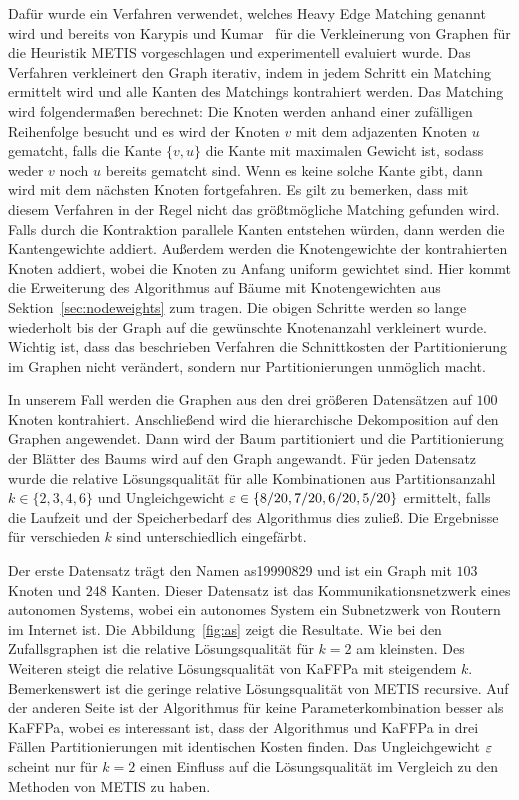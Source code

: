 Dafür wurde ein Verfahren verwendet, welches Heavy Edge Matching genannt wird und bereits von Karypis und Kumar~\cite{KK98} für die Verkleinerung von Graphen für die Heuristik METIS vorgeschlagen und experimentell evaluiert wurde.
Das Verfahren verkleinert den Graph iterativ, indem in jedem Schritt ein Matching ermittelt wird und alle Kanten des Matchings kontrahiert werden.
Das Matching wird folgendermaßen berechnet:
Die Knoten werden anhand einer zufälligen Reihenfolge besucht und es wird der Knoten $v$ mit dem adjazenten Knoten $u$ gematcht, falls die Kante $\{v, u\}$ die Kante mit maximalen Gewicht ist, sodass weder $v$ noch $u$ bereits gematcht sind.
Wenn es keine solche Kante gibt, dann wird mit dem nächsten Knoten fortgefahren.
Es gilt zu bemerken, dass mit diesem Verfahren in der Regel nicht das größtmögliche Matching gefunden wird.
Falls durch die Kontraktion parallele Kanten entstehen würden, dann werden die Kantengewichte addiert.
Außerdem werden die Knotengewichte der kontrahierten Knoten addiert, wobei die Knoten zu Anfang uniform gewichtet sind.
Hier kommt die Erweiterung des Algorithmus auf Bäume mit Knotengewichten aus Sektion~\ref{sec:nodeweights} zum tragen.
Die obigen Schritte werden so lange wiederholt bis der Graph auf die gewünschte Knotenanzahl verkleinert wurde.
Wichtig ist, dass das beschrieben Verfahren die Schnittkosten der Partitionierung im Graphen nicht verändert, sondern nur Partitionierungen unmöglich macht.

In unserem Fall werden die Graphen aus den drei größeren Datensätzen auf $100$ Knoten kontrahiert.
Anschließend wird die hierarchische Dekomposition auf den Graphen angewendet.
Dann wird der Baum partitioniert und die Partitionierung der Blätter des Baums wird auf den Graph angewandt.
Für jeden Datensatz wurde die relative Lösungsqualität für alle Kombinationen aus Partitionsanzahl $k \in \{2,3,4,6\}$ und Ungleichgewicht $\varepsilon \in \{8/20, 7/20, 6/20, 5/20\}$ ermittelt, falls die Laufzeit und der Speicherbedarf des Algorithmus dies zuließ.
Die Ergebnisse für verschieden $k$ sind unterschiedlich eingefärbt.

Der erste Datensatz trägt den Namen as19990829 und ist ein Graph mit $103$ Knoten und $248$ Kanten.
Dieser Datensatz ist das Kommunikationsnetzwerk eines autonomen Systems, wobei ein autonomes System ein Subnetzwerk von Routern im Internet ist.
Die Abbildung~\ref{fig:as} zeigt die Resultate.
Wie bei den Zufallsgraphen ist die relative Lösungsqualität für $k=2$ am kleinsten.
Des Weiteren steigt die relative Lösungsqualität von KaFFPa mit steigendem $k$.
Bemerkenswert ist die geringe relative Lösungsqualität von METIS recursive.
Auf der anderen Seite ist der Algorithmus für keine Parameterkombination besser als KaFFPa, wobei es interessant ist, dass der Algorithmus und KaFFPa in drei Fällen Partitionierungen mit identischen Kosten finden.
Das Ungleichgewicht $\varepsilon$ scheint nur für $k=2$ einen Einfluss auf die Lösungsqualität im Vergleich zu den Methoden von METIS zu haben.


